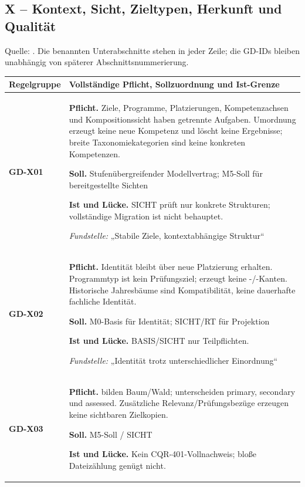 \subsection{X -- Kontext, Sicht, Zieltypen, Herkunft und Qualität}
Quelle: . Die benannten Unterabschnitte stehen in jeder Zeile; die GD-IDs bleiben unabhängig von späterer Abschnittsnummerierung.

\begingroup\small
\begin{longtable}{@{}P{20mm}P{128mm}@{}}
\toprule
Regelgruppe & Vollständige Pflicht, Sollzuordnung und Ist-Grenze\\
\midrule\endhead
{}\label{rule:GD-X01}\textbf{GD-X01} &
\textbf{Pflicht.} Ziele, Programme, Platzierungen, Kompetenzachsen und Kompositionssicht haben getrennte Aufgaben. Umordnung erzeugt keine neue Kompetenz und löscht keine Ergebnisse; breite Taxonomiekategorien sind keine konkreten Kompetenzen.\par\smallskip
\textbf{Soll.} Stufenübergreifender Modellvertrag; M5-Soll für bereitgestellte Sichten\par\smallskip
\textbf{Ist und Lücke.} SICHT prüft nur konkrete Strukturen; vollständige Migration ist nicht behauptet.\par\smallskip
\emph{Fundstelle:} „Stabile Ziele, kontextabhängige Struktur“\\\addlinespace[5pt]
\label{rule:GD-X02}\textbf{GD-X02} &
\textbf{Pflicht.} Identität bleibt über neue Platzierung erhalten. Programmtyp  ist kein Prüfungsziel;  erzeugt keine -/-Kanten. Historische Jahresbäume sind Kompatibilität, keine dauerhafte fachliche Identität.\par\smallskip
\textbf{Soll.} M0-Basis für Identität; SICHT/RT für Projektion\par\smallskip
\textbf{Ist und Lücke.} BASIS/SICHT nur Teilpflichten.\par\smallskip
\emph{Fundstelle:} „Identität trotz unterschiedlicher Einordnung“\\\addlinespace[5pt]
\label{rule:GD-X03}\textbf{GD-X03} &
\textbf{Pflicht.}  bilden Baum/Wald;  unterscheiden primary, secondary und assessed. Zusätzliche Relevanz/Prüfungsbezüge erzeugen keine sichtbaren Zielkopien.\par\smallskip
\textbf{Soll.} M5-Soll / SICHT\par\smallskip
\textbf{Ist und Lücke.} Kein CQR-401-Vollnachweis; bloße Dateizählung genügt nicht.\par\smallskip

\end{longtable}
